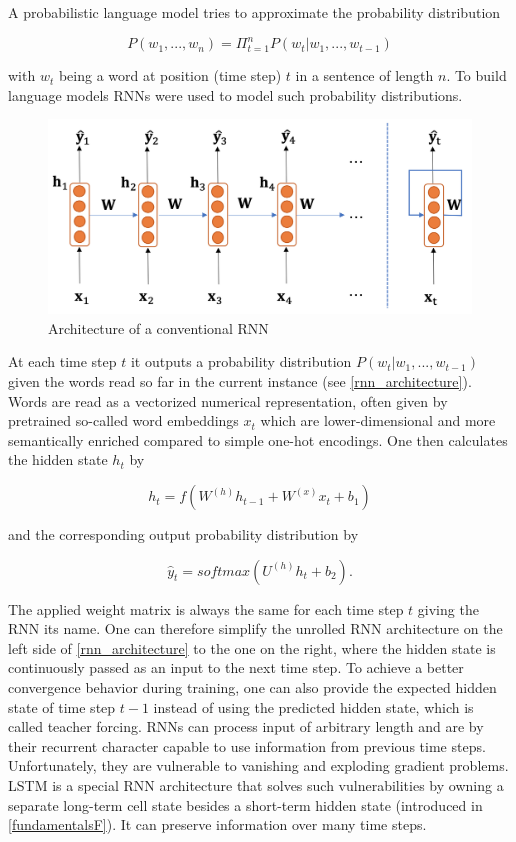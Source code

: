A probabilistic language model tries to approximate the probability distribution 

\begin{equation}
	P(w_1, ..., w_n) = \Pi_{t=1}^{n} P(w_t | w_1, ..., w_{t-1})
\end{equation}

with $w_t$ being a word at position (time step) $t$ in a sentence of length $n$. To build language models \acp{RNN} were used to model such probability distributions. 

\begin{figure}[ht]
	\centering
	\includegraphics[width=0.6\linewidth]{figures/rnn_architecture.png}
	\caption{Architecture of a conventional \ac{RNN} \cite[p. 46]{Gertz2020}}
	\label{rnn_architecture}
\end{figure}

At each time step $t$ it outputs a probability distribution $P(w_t | w_1, ..., w_{t-1})$ given the words read so far in the current instance (see \autoref{rnn_architecture}). Words are read as a vectorized numerical representation, often given by pretrained so-called word embeddings $x_t$ which are lower-dimensional and more semantically enriched compared to simple one-hot encodings. One then calculates the hidden state $h_t$ by

\begin{equation}
	h_t = f(W^{(h)} h_{t-1} + W^{(x)} x_t + b_1)
\end{equation}

and the corresponding output probability distribution by 

\begin{equation}
	\hat{y}_t = softmax(U^{(h)} h_t + b_2).
\end{equation}

The applied weight matrix is always the same for each time step $t$ giving the \ac{RNN} its name. One can therefore simplify the unrolled \ac{RNN} architecture on the left side of \autoref{rnn_architecture} to the one on the right, where the hidden state is continuously passed as an input to the next time step. To achieve a better convergence behavior during training, one can also provide the expected hidden state of time step $t-1$ instead of using the predicted hidden state, which is called teacher forcing. \acp{RNN} can process input of arbitrary length and are by their recurrent character capable to use information from previous time steps. Unfortunately, they are vulnerable to vanishing and exploding gradient problems. \ac{LSTM} is a special \ac{RNN} architecture that solves such vulnerabilities by owning a separate long-term cell state besides a short-term hidden state (introduced in \autoref{fundamentalsF}). It can preserve information over many time steps. \cite{Gertz2020}

